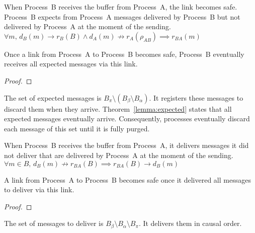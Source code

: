\begin{enumerate}[leftmargin=*]
\begin{definition}[To expect]
  When Process~B receives the buffer from Process~A, the link becomes safe.
  Process~B expects from Process~A messages delivered by Process~B but not
  delivered by Process~A at the moment of the sending.
  $\forall m,\, d_B(m) \rightarrow r_B(B)  \wedge d_A(m) \not\rightarrow r_A(\rho_{AB}) \implies r_{BA}(m)$
\end{definition}

\begin{lemma}
  Once a link from Process~A to Process~B becomes safe, Process~B eventually
  receives all expected messages via this link.
\end{lemma}

\begin{proof}
\end{proof}

The set of expected messages is $B_\pi \setminus (B_\beta \setminus B_\alpha)$.  It
registers these messages to discard them when they
arrive. Theorem~\ref{lemma:expected} states that all expected messages eventually
arrive. Consequently, processes eventually discard each message of this set
until it is fully purged. 

\begin{definition}[To deliver]
  When Process~B receives the buffer from Process~A, it delivers messages it did
  not deliver that are delivered by Process~A at the moment of the sending. \\
  $\forall m \in B,\, d_B(m) \not\rightarrow r_{BA}(B) \implies r_{BA}(B) \rightarrow
  d_B(m)$
\end{definition}

\begin{lemma}
  A link from Process~A to Process~B becomes safe once it delivered all messages
  to deliver via this link. 
\end{lemma}

\begin{proof}
\end{proof}

The set of messages to deliver is $B_\beta\setminus B_\alpha \setminus B_\pi$. It
delivers them in causal order.
\end{enumerate}

\begin{theorem}
\end{theorem}

